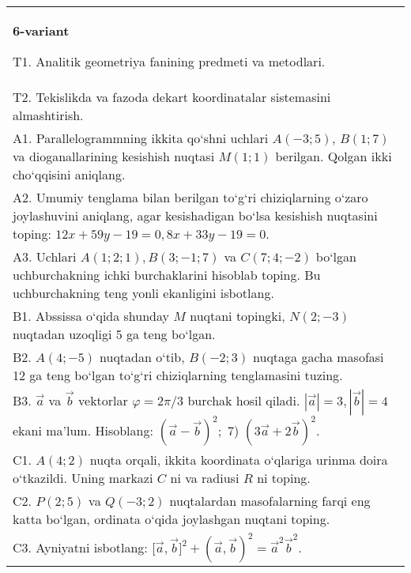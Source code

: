 \documentclass{article}
\begin{document}
\begin{tabular}{m{17cm}}
\textbf{6-variant}
\newline

T1. Analitik geometriya fanining predmeti va metodlari.
 \\
T2. Tekislikda va fazoda dekart koordinatalar sistemasini almashtirish.
 \\
A1. 
Parallelogrammning ikkita qo‘shni uchlari $A (-3;5) $, $B (1;7) $
va dioganallarining kesishish nuqtasi $M (1;1)$ berilgan. Qolgan ikki
cho‘qqisini aniqlang.
 \\
A2. 
Umumiy tenglama bilan berilgan to‘g‘ri chiziqlarning
o‘zaro joylashuvini aniqlang, agar kesishadigan bo‘lsa kesishish nuqtasini
toping: $12x+59y-19=0, 8x+33y-19=0$.
 \\
A3. 
Uchlari $A (1;2;1), B (3;-1;7) $ va $C (7;4;-2) $ bo‘lgan uchburchakning
ichki burchaklarini hisoblab toping. Bu uchburchakning teng yonli ekanligini isbotlang.
 \\
B1. 
Abssissa o‘qida shunday $M$ nuqtani topingki,
\(N (2;-3) \) nuqtadan uzoqligi 5 ga teng bo‘lgan.
 \\
B2. 
\(A (4;-5) \) nuqtadan o‘tib, \(B (-2;3) \) nuqtaga
gacha masofasi 12 ga teng bo‘lgan to‘g‘ri chiziqlarning tenglamasini tuzing.
 \\
B3. 
$\vec{a}$ va $\vec{b}$ vektorlar $\varphi = 2\pi/3$ burchak hosil qiladi. $|\vec{a}| = 3,|\vec{b}| = 4$ ekani ma’lum. Hisoblang:
$ (\vec{a} - \vec{b}) ^{2};$ 7) $ (3\vec{a} + 2\vec{b}) ^{2}$.
 \\
C1. \(A (4;2) \) nuqta orqali, ikkita koordinata o‘qlariga
urinma doira o‘tkazildi. Uning markazi $C$ ni va radiusi
$R$ ni toping.
 \\
C2. 
\(P (2;5) \) va \(Q (- 3;2) \) nuqtalardan masofalarning
farqi eng katta bo‘lgan, ordinata o‘qida joylashgan nuqtani toping.
 \\
C3. 
Ayniyatni isbotlang: \(\lbrack\vec{a},\vec{b}\rbrack^{2} + (\vec{a},\vec{b}) ^{2} = {\vec{a}}^{2}{\vec{b}}^{2}\).
 \\

\end{tabular}
\vspace{1cm}
\end{document}
